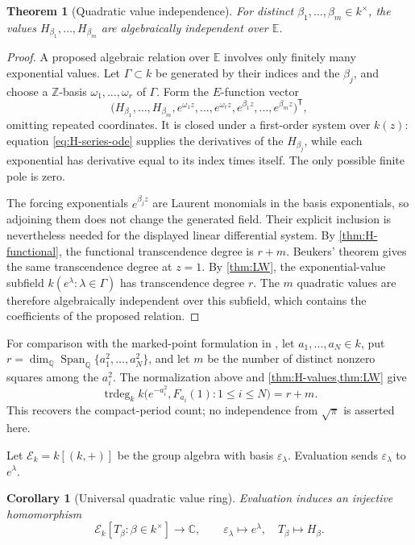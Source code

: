 \documentclass[11pt]{article}
\numberwithin{equation}{section}
\newtheorem{theorem}{Theorem}[section]
\newtheorem{corollary}[corollary]{Corollary}
\theoremstyle{definition}
\theoremstyle{remark}
\newcommand{\C}{\mathbb C}
\begin{document}
\begin{theorem}[Quadratic value independence]
\label{thm:H-values}
For distinct $\beta_1,\ldots,\beta_m\in k^\times$, the values
$H_{\beta_1},\ldots,H_{\beta_m}$ are algebraically independent over
$\mathbb E$.
\end{theorem}

\begin{proof}
A proposed algebraic relation over $\mathbb E$ involves only finitely many
exponential values.  Let $\Gamma\subset k$ be generated by their indices
and the $\beta_j$, and choose a $\mathbb Z$-basis
$\omega_1,\ldots,\omega_r$ of $\Gamma$.  Form the $E$-function vector
\[
  \bigl(H_{\beta_1},\ldots,H_{\beta_m},
        e^{\omega_1z},\ldots,e^{\omega_rz},
        e^{\beta_1z},\ldots,e^{\beta_mz}\bigr)^{\mathsf T},
\]
omitting repeated coordinates.  It is closed under a first-order system
over $k(z)$: equation \eqref{eq:H-series-ode} supplies the derivatives of
the $H_{\beta_j}$, while each exponential has derivative equal to its
index times itself.  The only possible finite pole is zero.

The forcing exponentials $e^{\beta_jz}$ are Laurent monomials in the
basis exponentials, so adjoining them does not change the generated
field.  Their explicit inclusion is nevertheless needed for the displayed
linear differential system.  By \cref{thm:H-functional}, the functional
transcendence degree is $r+m$.  Beukers' theorem gives the same
transcendence degree at $z=1$.  By \cref{thm:LW}, the exponential-value
subfield $k(e^\lambda:\lambda\in\Gamma)$ has transcendence degree $r$.
The $m$ quadratic values are therefore algebraically independent over this
subfield, which contains the coefficients of the proposed relation.
\end{proof}

For comparison with the marked-point formulation in \cite{Jossen2025},
let $a_1,\ldots,a_N\in k$, put
$r=\dim_{\mathbb Q}\operatorname{Span}_{\mathbb Q}\{a_1^2,\ldots,a_N^2\}$,
and let $m$ be the number of distinct nonzero squares among the $a_i^2$.
The normalization above and \cref{thm:H-values,thm:LW} give
\[
 \operatorname{trdeg}_k
 k\bigl(e^{-a_i^2},F_{a_i}(1):1\le i\le N\bigr)=r+m.
\]
This recovers the compact-period count; no independence from $\sqrt\pi$
is asserted here.

Let $\mathscr E_k=k[(k,+)]$ be the group algebra with basis
$\varepsilon_\lambda$.  Evaluation sends $\varepsilon_\lambda$ to
$e^\lambda$.

\begin{corollary}[Universal quadratic value ring]
\label{cor:universal-H-ring}
Evaluation induces an injective homomorphism
\begin{equation}\label{eq:universal-H-ring}
  \mathscr E_k[T_\beta:\beta\in k^\times]
  \longrightarrow\C,
  \qquad
  \varepsilon_\lambda\longmapsto e^\lambda,
  \quad
  T_\beta\longmapsto H_\beta.
\end{equation}
\end{corollary}
\end{document}

